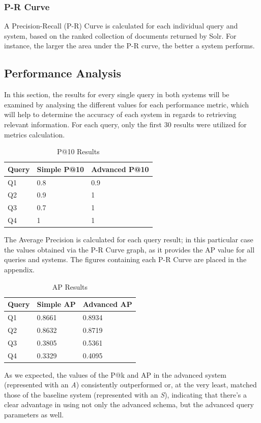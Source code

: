 \documentclass[sigconf]{acmart}
\begin{document}
\subsubsection{P-R Curve}

A Precision-Recall (P-R) Curve\cite{prcurves} is calculated for each individual query and system, based on the ranked collection of documents returned by Solr. For instance, the larger the area under the P-R curve\cite{auc}, the better a system performs.

\subsection{Performance Analysis}

In this section, the results for every single query in both systems will be examined by analysing the different values for each performance metric, which will help to determine the accuracy of each system in regards to retrieving relevant information. For each query, only the first 30 results were utilized for metrics calculation.\newline

\begin{table}[H]
	\begin{tabular}{ | m{5em} | m{1cm}| m{1.2cm} | }
		\hline
		Query& Simple P@10 & Advanced P@10 \\
		\hline
		Q1 & 0.8 & 0.9 \\
		\hline
		Q2 & 0.9 & 1 \\
		\hline
		Q3 & 0.7 & 1 \\
		\hline
		Q4 & 1 & 1 \\
		\hline
	\end{tabular}
	\caption{P@10 Results}
	\label{tab:pat10_results}
\end{table}
The Average Precision is calculated for each query result; in this particular case the values obtained via the P-R Curve graph, as it provides the AP value for all queries and systems. The figures containing each P-R Curve are placed in the appendix. \newline

\begin{table}[H]
	\begin{tabular}{ | m{5em} | m{1cm}| m{1.2cm} | }
		\hline
		Query& Simple AP & Advanced AP \\
		\hline
		Q1 & 0.8661 & 0.8934 \\
		\hline
		Q2 & 0.8632 & 0.8719 \\
		\hline
		Q3 & 0.3805 & 0.5361 \\
		\hline
		Q4 & 0.3329 & 0.4095 \\
		\hline
	\end{tabular}
	\caption{AP Results}
	\label{tab:ap_results}
\end{table}
As we expected, the values of the P@k and AP in the advanced
system (represented with an \textit{A}) consistently outperformed or, at the very least, matched those of the baseline system (represented with an
\textit{S}), indicating that there’s a clear advantage in using not only the advanced schema, but the advanced query parameters as well.
\end{document}
